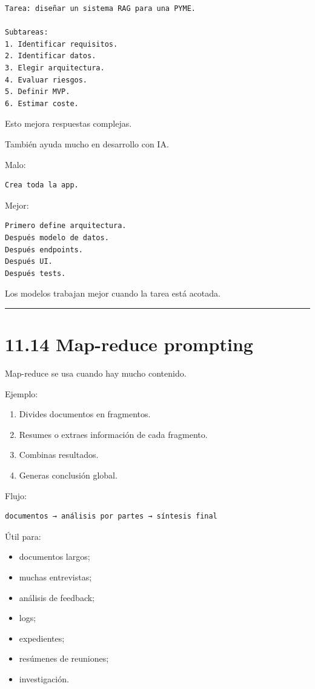 \begin{lstlisting}
Tarea: diseñar un sistema RAG para una PYME.

Subtareas:
1. Identificar requisitos.
2. Identificar datos.
3. Elegir arquitectura.
4. Evaluar riesgos.
5. Definir MVP.
6. Estimar coste.
\end{lstlisting}

Esto mejora respuestas complejas.

También ayuda mucho en desarrollo con IA.

Malo:

\begin{lstlisting}
Crea toda la app.
\end{lstlisting}

Mejor:

\begin{lstlisting}
Primero define arquitectura.
Después modelo de datos.
Después endpoints.
Después UI.
Después tests.
\end{lstlisting}

Los modelos trabajan mejor cuando la tarea está acotada.

\begin{center}\rule{0.5\linewidth}{0.5pt}\end{center}

\section{11.14 Map-reduce prompting}\label{map-reduce-prompting}

Map-reduce se usa cuando hay mucho contenido.

Ejemplo:

\begin{enumerate}
\def\labelenumi{\arabic{enumi}.}
\tightlist
\item
  Divides documentos en fragmentos.
\item
  Resumes o extraes información de cada fragmento.
\item
  Combinas resultados.
\item
  Generas conclusión global.
\end{enumerate}

Flujo:

\begin{lstlisting}
documentos → análisis por partes → síntesis final
\end{lstlisting}

Útil para:

\begin{itemize}
\tightlist
\item
  documentos largos;
\item
  muchas entrevistas;
\item
  análisis de feedback;
\item
  logs;
\item
  expedientes;
\item
  resúmenes de reuniones;
\item
  investigación.
\end{itemize}

